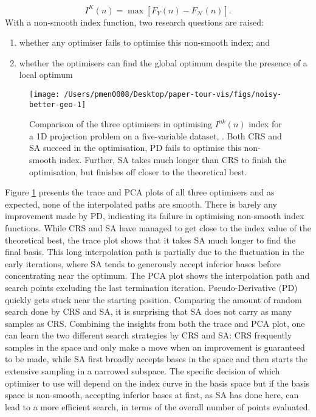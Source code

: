 \[I^{K}(n) = \max \left[F_{Y}(n) - F_{\mathcal{N}}(n)\right].\] With a
non-smooth index function, two research questions are raised:

\begin{enumerate}
\def\labelenumi{\arabic{enumi})}
\tightlist
\item
  whether any optimiser fails to optimise this non-smooth index; and
\item
  whether the optimisers can find the global optimum despite the
  presence of a local optimum
\end{enumerate}

\begin{Schunk}
\begin{figure}

{\centering \texttt{[image: /Users/pmen0008/Desktop/paper-tour-vis/figs/noisy-better-geo-1]} 

}

\caption[Comparison of the three optimisers in optimising $I^{nk}(n)$ index for a 1D projection problem on a five-variable dataset, ]{Comparison of the three optimisers in optimising $I^{nk}(n)$ index for a 1D projection problem on a five-variable dataset, . Both CRS and SA succeed in the optimisation, PD fails to optimise this non-smooth index. Further, SA takes  much longer than CRS to finish the optimisation, but finishes off closer to the theoretical best.}\label{fig:noisy-better-geo}
\end{figure}
\end{Schunk}

Figure \ref{fig:noisy-better-geo} presents the trace and PCA plots of
all three optimisers and as expected, none of the interpolated paths are
smooth. There is barely any improvement made by PD, indicating its
failure in optimising non-smooth index functions. While CRS and SA have
managed to get close to the index value of the theoretical best, the
trace plot shows that it takes SA much longer to find the final basis.
This long interpolation path is partially due to the fluctuation in the
early iterations, where SA tends to generously accept inferior bases
before concentrating near the optimum. The PCA plot shows the
interpolation path and search points excluding the last termination
iteration. Pseudo-Derivative (PD) quickly gets stuck near the starting
position. Comparing the amount of random search done by CRS and SA, it
is surprising that SA does not carry as many samples as CRS. Combining
the insights from both the trace and PCA plot, one can learn the two
different search strategies by CRS and SA: CRS frequently samples in the
space and only make a move when an improvement is guaranteed to be made,
while SA first broadly accepts bases in the space and then starts the
extensive sampling in a narrowed subspace. The specific decision of
which optimiser to use will depend on the index curve in the basis space
but if the basis space is non-smooth, accepting inferior bases at first,
as SA has done here, can lead to a more efficient search, in terms of
the overall number of points evaluated.

